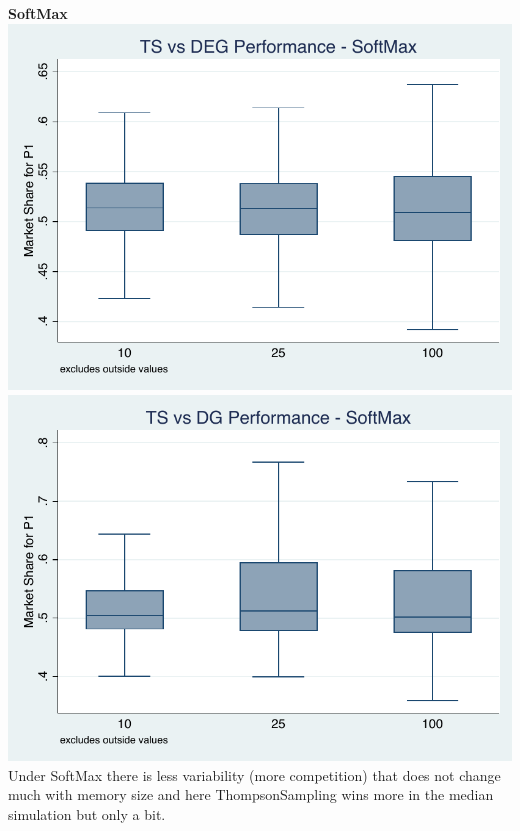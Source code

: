 \documentclass[11pt,letterpaper]{article}
\begin{document}
\pagebreak
\textbf{SoftMax} \\
\includegraphics[scale=0.9]{sm_ts_deg} \\
\includegraphics[scale=0.9]{sm_ts_dg} \\
Under SoftMax there is less variability (more competition) that does not change much with memory size and here ThompsonSampling wins more in the median simulation but only a bit.
\end{document}
